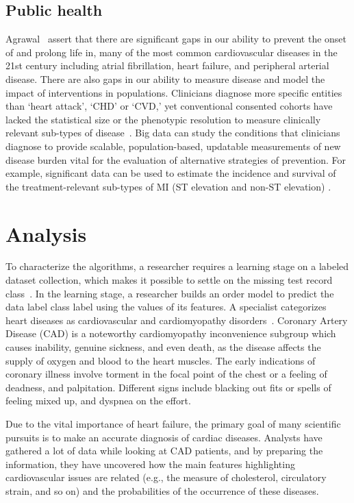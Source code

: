 \subsection{Public health}

Agrawal~\cite{agrawal1993mining} assert that there are significant
gaps in our ability to prevent the onset of and prolong life in, many
of the most common cardiovascular diseases in the 21st century
including atrial fibrillation, heart failure, and peripheral arterial
disease. There are also gaps in our ability to measure disease and
model the impact of interventions in populations. Clinicians diagnose
more specific entities than `heart attack', `CHD' or `CVD,' yet
conventional consented cohorts have lacked the statistical size or the
phenotypic resolution to measure clinically relevant sub-types of
disease~\cite{chu2009bayesian}. Big data can study the conditions that
clinicians diagnose to provide scalable, population-based, updatable
measurements of new disease burden vital for the evaluation of
alternative strategies of prevention. For example, significant data
can be used to estimate the incidence and survival of the
treatment-relevant sub-types of MI (ST elevation and non-ST elevation)
\cite{dietterich2000ensemble}.

\section{Analysis}

To characterize the algorithms, a researcher requires a learning stage
on a labeled dataset collection, which makes it possible to settle on
the missing test record class~\cite{ali}. 
In the learning stage, a researcher builds an order model to predict
the data label class label using the values of its features. 
A specialist categorizes heart diseases as cardiovascular and
cardiomyopathy disorders~\cite{ali}. 
Coronary Artery Disease (CAD) is a noteworthy cardiomyopathy
inconvenience subgroup which causes inability, genuine sickness, and
even death, as the disease affects the supply of  oxygen and blood to
the heart muscles. 
The early indications of coronary illness involve torment in the focal
point of the chest or a feeling of deadness, and palpitation. 
Different signs include blacking out fits or spells of feeling mixed
up, and dyspnea on the effort. 
\par Due to the vital importance of heart failure, the primary goal of
many scientific pursuits is to make an accurate diagnosis of cardiac
diseases. Analysts have gathered a lot of data while looking at CAD
patients, and by preparing the information, they have uncovered how
the main features highlighting cardiovascular issues are related
(e.g., the measure of cholesterol, circulatory strain, and so on) and
the probabilities of the occurrence of these diseases.

